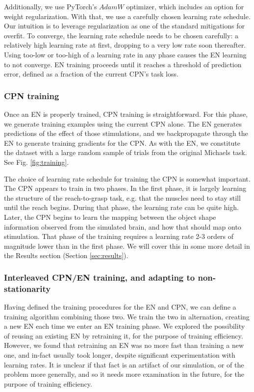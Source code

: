 \documentclass[12pt]{iopart}
\begin{document}
Additionally, we use PyTorch's $AdamW$ optimizer, which includes an option for weight regularization.
With that, we use a carefully chosen learning rate schedule. Our intuition is to leverage regularization as
one of the standard mitigations for overfit. To converge, the learning rate schedule needs
to be chosen carefully: a relatively high learning rate at first, dropping to a very low rate soon
thereafter. Using too-low or too-high of a learning rate in any phase causes the EN learning
to not converge. EN training proceeds until it reaches a threshold of prediction error, defined as
a fraction of the current CPN's task loss.

\subsubsection{CPN training}
Once an EN is properly trained, CPN training is straightforward. For this phase,
we generate training examples using the current CPN alone. The EN generates predictions of the
effect of those stimulations, and we backpropagate through the EN to generate training gradients
for the CPN. As with the EN, we constitute the dataset with a large random sample of trials from
the original Michaels task. See Fig. \ref{fig:training}.

The choice of learning rate schedule for training the CPN is somewhat important.
The CPN appears to train in two phases. In the first phase, it is largely learning the structure
of the reach-to-grasp task, e.g. that the muscles need to stay still until the reach begins. During
that phase, the learning rate can be quite high. Later, the CPN begins to learn the mapping between
the object shape information observed from the simulated brain, and how that should map onto
stimulation. That phase of the training requires a learning rate 2-3 orders of magnitude lower than
in the first phase. We will cover this in some more detail in the Results section
(Section \ref{sec:results}).

\subsubsection{Interleaved CPN/EN training, and adapting to non-stationarity}
Having defined the training procedures for the EN and CPN, we can define a training
algorithm combining those two. We train the two in alternation, creating
a new EN each time we enter an EN training phase. We explored the possibility
of reusing an existing EN by retraining it, for the purpose of training efficiency.
However, we found that retraining an EN was no more fast than training a new one,
and in-fact usually took longer, despite significant experimentation with learning
rates. It is unclear if that fact is an artifact of our simulation, or of the
problem more generally, and so it needs more examination in the future, for the
purpose of training efficiency.
\end{document}
